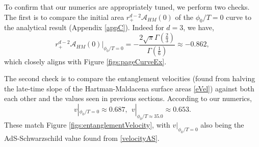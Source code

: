 \documentclass[12pt,a4paper]{article}
\begin{document}
To confirm that our numerics are appropriately tuned, we perform two checks. The first is to compare the initial area $r_+^{d-2} \mathcal{A}_{HM}(0)$ of the $\phi_0/T = 0$ curve to the analytical result (Appendix \ref{appC}). Indeed for $d = 3$, we have,
\begin{equation}
r_+^{d-2}\mathcal{A}_{HM}(0)|_{\phi_0/T = 0} = -\frac{2\sqrt{\pi}\Gamma\left(\frac{2}{3}\right)}{\Gamma\left(\frac{1}{6}\right)} \approx -0.862,
\end{equation}
which closely aligns with Figure \ref{figs:pageCurveEx}.

The second check is to compare the entanglement velocities (found from halving the late-time slope of the Hartman-Maldacena surface areas \eqref{eVel}) against both each other and the values seen in previous sections. According to our numerics,
\begin{equation}
v|_{\phi_0/T = 0} \approx 0.687,\ \ v|_{\phi_0/T \approx 35.0} \approx 0.653.
\end{equation}
These match Figure \ref{figs:entanglementVelocity}, with $v|_{\phi_0/T = 0}$ also being the AdS-Schwarzschild value found from \eqref{velocityAS}.
\end{document}
